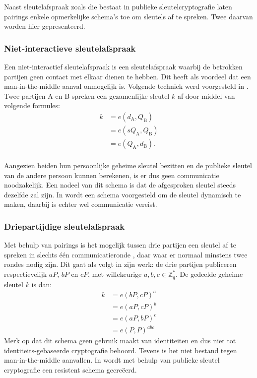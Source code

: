 Naast sleutelafspraak zoals die bestaat in publieke sleutelcryptografie laten pairings enkele opmerkelijke schema's toe om sleutels af te spreken. Twee daarvan worden hier gepresenteerd.

\subsubsection{Niet-interactieve sleutelafspraak}

Een niet-interactief sleutelafspraak is een sleutelafspraak waarbij de betrokken partijen geen contact met elkaar dienen te hebben. Dit heeft als voordeel dat een man-in-the-middle aanval onmogelijk is. Volgende techniek werd voorgesteld in \cite{sakai}. Twee partijen A en B spreken een gezamenlijke sleutel $k$ af door middel van volgende formules:
\[\begin{aligned}
k	&= e(d_{\text{A}}, Q_{\text{B}})\\
	&= e(s Q_{\text{A}}, Q_{\text{B}})\\
	&= e(Q_{\text{A}}, d_{\text{B}}).\\
\end{aligned}\]

Aangezien beiden hun persoonlijke geheime sleutel bezitten en de publieke sleutel van de andere persoon kunnen berekenen, is er dus geen communicatie noodzakelijk. Een nadeel van dit schema is dat de afgesproken sleutel steeds dezelfde zal zijn. In \cite{smart} wordt een schema voorgesteld om de sleutel dynamisch te maken, daarbij is echter wel communicatie vereist.

\subsubsection{Driepartijdige sleutelafspraak}

Met behulp van pairings is het mogelijk tussen drie partijen een sleutel af te spreken in slechts \'e\'en communicatieronde \cite{joux}, daar waar er normaal minstens twee rondes nodig zijn. Dit gaat als volgt in zijn werk: de drie partijen publiceren respectievelijk $aP$, $bP$ en $cP$, met willekeurige $a, b, c \in \mathbb{Z}_q^*$. De gedeelde geheime sleutel $k$ is dan:
\[\begin{aligned}
k	&= e(bP, cP)^a\\
	&= e(aP, cP)^b\\
	&= e(aP, bP)^c\\
	&= e(P, P)^{abc}
\end{aligned}\]
Merk op dat dit schema geen gebruik maakt van identiteiten en dus niet tot identiteits-gebaseerde cryptografie behoord. Tevens is het niet bestand tegen man-in-the-middle aanvallen. In \cite{paterson} wordt met behulp van publieke sleutel cryptografie een resistent schema gecre\"eerd.
